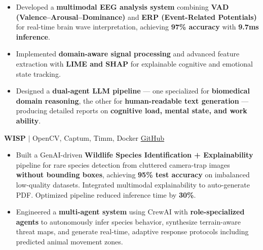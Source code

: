 \documentclass[a4paper,20pt]{article}
\newcommand{\resumeItem}[1]{
  \item\small{#1 \vspace{-2pt}}
}
\newcommand{\resumeItemListStart}{\begin{itemize}}
\newcommand{\resumeItemListEnd}{\end{itemize}\vspace{-5pt}}
\begin{document}
  \resumeItemListStart
    \resumeItem{Developed a \textbf{multimodal EEG analysis system} combining \textbf{VAD (Valence–Arousal–Dominance)} and \textbf{ERP (Event-Related Potentials)} for real-time brain wave interpretation, achieving \textbf{97\% accuracy} with \textbf{9.7ms inference}.}
    \resumeItem{Implemented \textbf{domain-aware signal processing} and advanced feature extraction with \textbf{LIME and SHAP} for explainable cognitive and emotional state tracking.}
    \resumeItem{Designed a \textbf{dual-agent LLM pipeline} — one specialized for \textbf{biomedical domain reasoning}, the other for \textbf{human-readable text generation} — producing detailed reports on \textbf{cognitive load, mental state, and work ability}.}
  \resumeItemListEnd

\item
  \textbf{WISP} $|$ OpenCV, Captum, Timm, Docker \hfill\href{https://github.com/Vishal-AS-0407/WISP}{GitHub} \\
  

  \resumeItemListStart
    \resumeItem{Built a GenAI-driven \textbf{Wildlife Species Identification + Explainability} pipeline for rare species detection from cluttered camera-trap images \textbf{without bounding boxes}, achieving \textbf{95\% test accuracy} on imbalanced low-quality datasets. Integrated multimodal explainability to auto-generate PDF. Optimized pipeline reduced inference time by \textbf{30\%}.}
    \vspace{-10pt}
    \resumeItem{Engineered a \textbf{multi-agent system} using CrewAI with \textbf{role-specialized agents} to autonomously infer species behavior, synthesize terrain-aware threat maps, and generate real-time, adaptive response protocols including predicted animal movement zones.}

  \resumeItemListEnd
\end{document}

